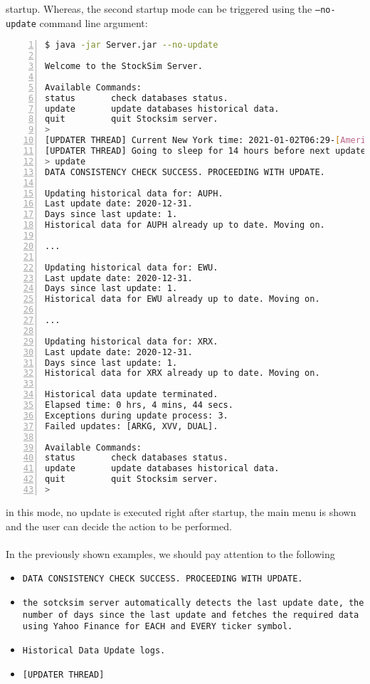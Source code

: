 startup. Whereas, the second startup mode can be triggered using the
\texttt{--no-update} command line argument:
\begin{lstlisting}[basicstyle=\footnotesize,language=bash,numbers=left,
numberstyle=\footnotesize,numbersep=8pt,frame=single]
$ java -jar Server.jar --no-update

Welcome to the StockSim Server.

Available Commands:
status       check databases status.
update       update databases historical data.
quit         quit Stocksim server.
> 
[UPDATER THREAD] Current New York time: 2021-01-02T06:29-[America/New_York]
[UPDATER THREAD] Going to sleep for 14 hours before next update.
> update
DATA CONSISTENCY CHECK SUCCESS. PROCEEDING WITH UPDATE.

Updating historical data for: AUPH.
Last update date: 2020-12-31.
Days since last update: 1.
Historical data for AUPH already up to date. Moving on.

...

Updating historical data for: EWU.
Last update date: 2020-12-31.
Days since last update: 1.
Historical data for EWU already up to date. Moving on.

...

Updating historical data for: XRX.
Last update date: 2020-12-31.
Days since last update: 1.
Historical data for XRX already up to date. Moving on.

Historical data update terminated.
Elapsed time: 0 hrs, 4 mins, 44 secs.
Exceptions during update process: 3.
Failed updates: [ARKG, XVV, DUAL].

Available Commands:
status       check databases status.
update       update databases historical data.
quit         quit Stocksim server.
> 
\end{lstlisting}
in this mode, no update is executed right after startup, the main menu is shown
and the user can decide the action to be performed.\\
\\
In the previously shown examples, we should pay attention to the following
\begin{itemize}
    \item \texttt{DATA CONSISTENCY CHECK SUCCESS. PROCEEDING WITH UPDATE.}
    \item \texttt{the sotcksim server automatically detects the last update
    date, the number of days since the last update and fetches the required
    data using Yahoo Finance for EACH and EVERY ticker symbol.}
    \item \texttt{Historical Data Update logs.}
    \item \texttt{[UPDATER THREAD]}
\end{itemize}
